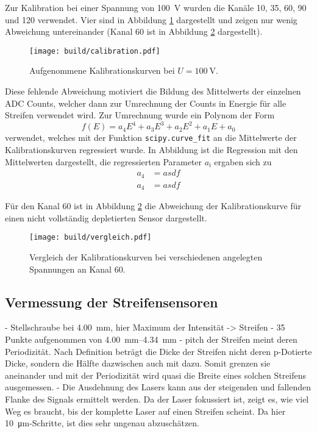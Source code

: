Zur Kalibration bei einer Spannung von \SI{100}{\volt} wurden die Kanäle
10, 35, 60, 90 und 120 verwendet.
Vier sind in Abbildung \ref{fig:calibration} dargestellt und zeigen nur wenig
Abweichung untereinander (Kanal 60 ist in Abbildung \ref{fig:vergleich} dargestellt).
\begin{figure}
  \centering
  \texttt{[image: build/calibration.pdf]}  %
  \caption{Aufgenommene Kalibrationskurven bei $U = \SI{100}{\volt}$.}
  \label{fig:calibration}
\end{figure}
Diese fehlende Abweichung motiviert die Bildung des Mittelwerts der einzelnen ADC Counts,
welcher dann zur Umrechnung der Counts in Energie für alle Streifen verwendet wird.
Zur Umrechnung wurde ein Polynom der Form
\begin{equation*}
  f\!\left(E\right) = a_4 E^4 + a_3 E^3 + a_2 E^2 + a_1 E + a_0
\end{equation*}
verwendet, welches mit der Funktion \texttt{scipy.curve\_fit} an die Mittelwerte
der Kalibrationskurven regressiert wurde.
In Abbildung %
ist die Regression mit den Mittelwerten dargestellt,
die regressierten Parameter $a_\text{i}$ ergaben sich zu
\begin{align*}
  a_4 &= asdf \\
  a_4 &= asdf
\end{align*}

Für den Kanal 60 ist in Abbildung \ref{fig:vergleich} die Abweichung der Kalibrationskurve
für einen nicht vollständig depletierten Sensor dargestellt.
\begin{figure}
  \centering
  \texttt{[image: build/vergleich.pdf]}  %
  \caption{Vergleich der Kalibrationskurven bei verschiedenen angelegten Spannungen
    an Kanal 60.}
  \label{fig:vergleich}
\end{figure}


\subsection{Vermessung der Streifensensoren}
\label{sec:Vermessung-Auswertung}

- Stellschraube bei \SI{4.00}{\milli\meter}, hier Maximum der Intensität -> Streifen
- 35 Punkte aufgenommen von \SIrange{4.00}{4.34}{\milli\meter}
- pitch der Streifen meint deren Periodizität. Nach Definition beträgt die Dicke der
Streifen nicht deren p-Dotierte Dicke, sondern die Hälfte dazwischen auch mit dazu.
Somit grenzen sie aneinander und mit der Periodizität wird quasi die Breite eines
solchen Streifens ausgemessen.
- Die Ausdehnung des Lasers kann aus der steigenden und fallenden Flanke des Signals
ermittelt werden. Da der Laser fokussiert ist, zeigt es, wie viel Weg es braucht,
bis der komplette Laser auf einen Streifen scheint. Da hier \SI{10}{\micro\meter}-Schritte,
ist dies sehr ungenau abzuschätzen.

